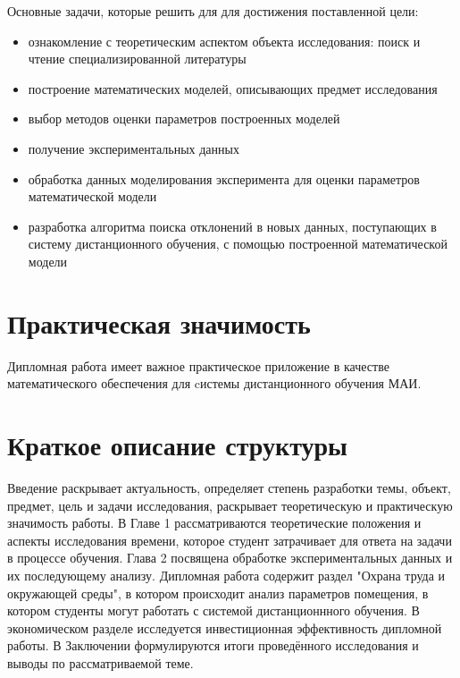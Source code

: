 Основные задачи, которые решить для для достижения поставленной цели:
\begin{itemize}
\item ознакомление с теоретическим аспектом объекта исследования: поиск и чтение специализированной литературы
\item построение математических моделей, описывающих предмет исследо\-вания
\item выбор методов оценки параметров построенных моделей
\item получение экспериментальных  данных
\item обработка данных моделирования эксперимента для оценки параметров математической модели
\item разработка алгоритма поиска отклонений в  новых данных, поступа\-ющих в систему дистанционного обучения, с помощью построенной мате\-матической модели
\end{itemize}


\section{Практическая значимость}

Дипломная работа имеет важное практическое приложение в качестве математического обеспечения для cистемы дистанционного обучения МАИ.

\section{Краткое описание структуры}

Введение раскрывает актуальность, определяет степень разра\-ботки темы, объект, предмет,  цель и задачи исследования, раскрывает теоре\-тическую и прак\-тическую значимость работы.
В Главе 1 рассматриваются теоретические положения и аспекты исследования времени, которое студент затрачивает для ответа на задачи в процес\-се обучения.
Глава 2 посвящена обработке экспериментальных данных и их последую\-щему анализу. Дипломная работа содержит раздел "Охрана труда и окружающей среды", в котором происходит анализ параметров помещения, в котором студенты могут работать с системой дистанционнного обучения. В экономическом разделе исследуется инвести\-ционная эффективность дипломной работы.
В Заключе\-нии формулируются итоги проведённого исследования и выводы по рассматри\-ваемой теме.